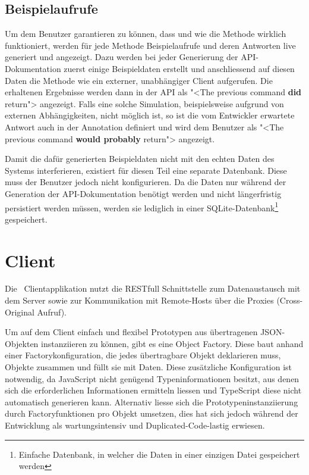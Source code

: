 	\subsection{Beispielaufrufe}
	\label{subsubsec:exampleQueries}
		Um dem Benutzer garantieren zu können, dass und wie die Methode wirklich funktioniert,
		werden für jede Methode Beispielaufrufe und deren Antworten live generiert und angezeigt.
		Dazu werden bei jeder Generierung der API-Dokumentation zuerst einige Beispieldaten erstellt
		und anschliessend auf diesen Daten die Methode wie ein externer, unabhängiger Client aufgerufen.
		Die erhaltenen Ergebnisse werden dann in der API als "<The previous command \textbf{did} return"> angezeigt.
		Falls eine solche Simulation, beispielsweise aufgrund von externen Abhängigkeiten, nicht möglich ist,
		so ist die vom Entwickler erwartete Antwort auch in der Annotation definiert und wird dem Benutzer als
		"<The previous command \textbf{would probably} return"> angezeigt.
		
		Damit die dafür generierten Beispieldaten nicht mit den echten Daten des Systems interferieren,
		existiert für diesen Teil eine separate Datenbank.
		Diese muss der Benutzer jedoch nicht konfigurieren.
		Da die Daten nur während der Generation der API-Dokumentation benötigt werden
		und nicht längerfristig persistiert werden müssen,
		werden sie lediglich in einer SQLite-Datenbank\footnote{Einfache Datenbank, in welcher die Daten in einer einzigen Datei gespeichert werden} gespeichert.
	


\section{Client}
		Die \eeppi\ Clientapplikation nutzt die RESTfull Schnittstelle zum Datenaustausch mit dem Server sowie zur Kommunikation mit Remote-Hosts über die Proxies (Cross-Original Aufruf).
		
		Um auf dem Client einfach und flexibel Prototypen aus übertragenen JSON-Objekten instanziieren zu können, gibt es eine Object Factory.
		Diese baut anhand einer Factorykonfiguration, die jedes übertragbare Objekt deklarieren muss, Objekte zusammen und füllt sie mit Daten.
		Diese zusätzliche Konfiguration ist notwendig, da JavaScript nicht genügend Typeninformationen besitzt, aus denen sich die erforderlichen Informationen ermitteln liessen und TypeScript diese nicht automatisch generieren kann.
		Alternativ liesse sich die Prototypeninstanziierung  durch Factoryfunktionen pro Objekt umsetzen, dies hat sich jedoch während der Entwicklung als wartungsintensiv und Duplicated-Code-lastig erwiesen.
		
